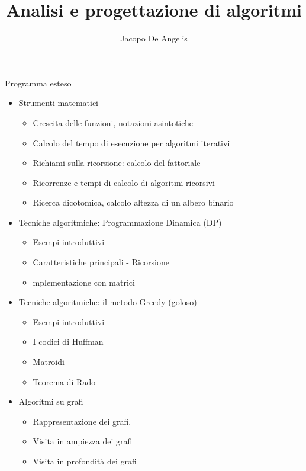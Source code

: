 \documentclass[11pt,a4paper]{book}
\begin{document}
\title{Analisi e progettazione di algoritmi}
\author{Jacopo De Angelis}
\maketitle

\pagebreak
\tableofcontents
\pagebreak

\begin{LARGE}
Programma esteso
\end{LARGE}

\begin{itemize}
    \item Strumenti matematici
    \begin{itemize}
        \item Crescita delle funzioni, notazioni asintotiche
        \item Calcolo del tempo di esecuzione per algoritmi iterativi
        \item Richiami sulla ricorsione: calcolo del fattoriale
        \item Ricorrenze e tempi di calcolo di algoritmi ricorsivi
        \item Ricerca dicotomica, calcolo altezza di un albero binario
    \end{itemize}

    \item Tecniche algoritmiche: Programmazione Dinamica (DP)
    \begin{itemize}
        \item Esempi introduttivi
        \item Caratteristiche principali - Ricorsione
        \item mplementazione con matrici   
    \end{itemize}

    \item Tecniche algoritmiche: il metodo Greedy (goloso)
    \begin{itemize}
        \item Esempi introduttivi
        \item I codici di Huffman
        \item Matroidi
        \item Teorema di Rado  
    \end{itemize}

    \item Algoritmi su grafi
    \begin{itemize}
        \item Rappresentazione dei grafi.
        \item Visita in ampiezza dei grafi
        \item Visita in profondità dei grafi    
    \end{itemize}


\end{itemize}
\end{document}
